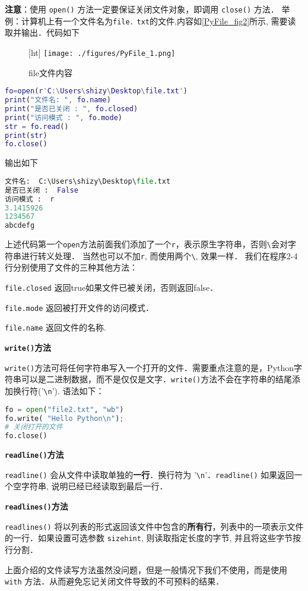 \textbf{注意}：使用 \verb|open()| 方法一定要保证关闭文件对象，即调用 \verb|close()| 方法． 举例：计算机上有一个文件名为\verb|file．txt|的文件,内容如\autoref{PyFile_fig2}所示, 需要读取并输出．代码如下
\begin{figure}\label{PyFile_fig2}[ht]
\centering
\texttt{[image: ./figures/PyFile\_1.png]}
\caption{file文件内容} \label{PyFile_fig1}
\end{figure}
\begin{lstlisting}[language=matlab]
fo=open(r'C:\Users\shizy\Desktop\file.txt')
print("文件名: ", fo.name)
print("是否已关闭 : ", fo.closed)
print("访问模式 : ", fo.mode)
str = fo.read()
print(str)
fo.close()
\end{lstlisting}
输出如下
\begin{lstlisting}[language=python]
文件名:  C:\Users\shizy\Desktop\file.txt
是否已关闭 :  False
访问模式 :  r
3.1415926
1234567
abcdefg
\end{lstlisting}
上述代码第一个\verb|open|方法前面我们添加了一个\verb|r|，表示原生字符串，否则\verb|\|会对字符串进行转义处理． 当然也可以不加\verb|r|, 而使用两个\verb|\|, 效果一样． 我们在程序2-4行分别使用了文件的三种其他方法：

\verb|file.closed|	返回true如果文件已被关闭，否则返回false．

\verb|file.mode|	返回被打开文件的访问模式．

\verb|file.name|	返回文件的名称.


\textbf{\verb|write()|方法}

\verb|write()|方法可将任何字符串写入一个打开的文件．需要重点注意的是，Python字符串可以是二进制数据，而不是仅仅是文字．\verb|write()|方法不会在字符串的结尾添加换行符('\verb|\n|'). 语法如下：
\begin{lstlisting}[language=python]
fo = open("file2.txt", "wb")
fo.write( "Hello Python\n");
# 关闭打开的文件
fo.close()
\end{lstlisting}

\textbf{\verb|readline()|方法}

\verb|readline()| 会从文件中读取单独的\textbf{一行}．换行符为 '\verb|\n|'．\verb|readline()| 如果返回一个空字符串, 说明已经已经读取到最后一行．

\textbf{\verb|readlines()|方法}

\verb|readlines()| 将以列表的形式返回该文件中包含的\textbf{所有行}，列表中的一项表示文件的一行．如果设置可选参数 \verb|sizehint|, 则读取指定长度的字节, 并且将这些字节按行分割．

上面介绍的文件读写方法虽然没问题，但是一般情况下我们不使用，而是使用\verb|with| 方法．从而避免忘记关闭文件导致的不可预料的结果．


